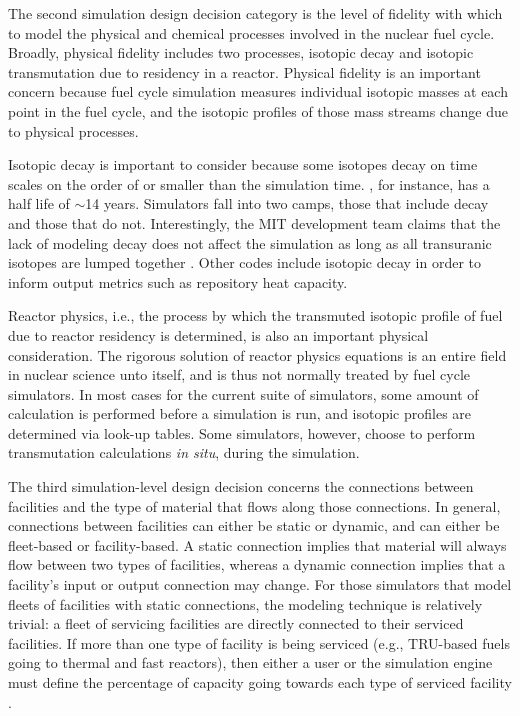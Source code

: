 The second simulation design decision category is the level of fidelity with
which to model the physical and chemical processes involved in the nuclear fuel
cycle. Broadly, physical fidelity includes two processes, isotopic decay and
isotopic transmutation due to residency in a reactor. Physical fidelity is an
important concern because fuel cycle simulation measures individual isotopic
masses at each point in the fuel cycle, and the isotopic profiles of those mass
streams change due to physical processes. 

Isotopic decay is important to consider because some isotopes decay on time
scales on the order of or smaller than the simulation time. , for
instance, has a half life of $\sim$14 years. Simulators fall into two camps,
those that include decay and those that do not. Interestingly, the MIT
development team claims that the lack of modeling decay does not affect the
simulation as long as all transuranic isotopes are lumped together
\cite{guerin_impact_2009}. Other codes include isotopic decay in order to inform
output metrics such as repository heat capacity.

Reactor physics, i.e., the process by which the transmuted isotopic profile of
fuel due to reactor residency is determined, is also an important physical
consideration. The rigorous solution of reactor physics equations is an entire
field in nuclear science unto itself, and is thus not normally treated by fuel
cycle simulators. In most cases for the current suite of simulators, some amount
of calculation is performed before a simulation is run, and isotopic profiles
are determined via look-up tables. Some simulators, however, choose to perform
transmutation calculations \textit{in situ}, during the simulation.

The third simulation-level design decision concerns the connections between
facilities and the type of material that flows along those connections. In
general, connections between facilities can either be static or dynamic, and can
either be fleet-based or facility-based. A static connection implies that
material will always flow between two types of facilities, whereas a dynamic
connection implies that a facility's input or output connection may change.  For
those simulators that model fleets of facilities with static connections, the
modeling technique is relatively trivial: a fleet of servicing facilities are
directly connected to their serviced facilities. If more than one type of
facility is being serviced (e.g., TRU-based fuels going to thermal and fast
reactors), then either a user or the simulation engine must define the
percentage of capacity going towards each type of serviced facility
\cite{busquim_e_silva_system_2008}.

